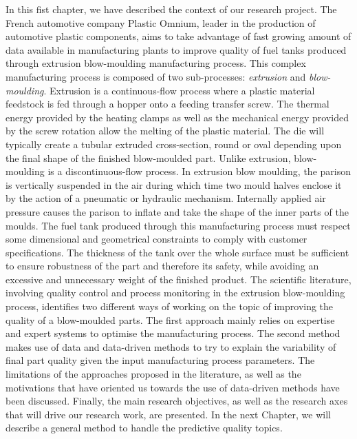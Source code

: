 In this fist chapter, we have described the context of our research project. The French automotive company Plastic Omnium, leader in the production of automotive plastic components, aims to take advantage of fast growing amount of data available in manufacturing plants to improve quality of fuel tanks produced through extrusion blow-moulding manufacturing process. This complex manufacturing process is composed of two sub-processes: \textit{extrusion} and \textit{blow-moulding}. Extrusion is a continuous-flow process where a plastic material feedstock is fed through a hopper onto a feeding transfer screw. The thermal energy provided by the heating clamps as well as the mechanical energy provided by the screw rotation allow the melting of the plastic material. The die will typically create a tubular extruded cross-section, round or oval depending upon the final shape of the finished blow-moulded part. Unlike extrusion, blow-moulding is a discontinuous-flow process. In extrusion blow moulding, the parison is vertically suspended in the air during which time two mould halves enclose it by the action of a pneumatic or hydraulic mechanism. Internally applied air pressure causes the parison to inflate and take the shape of the inner parts of the moulds. The fuel tank produced through this manufacturing process must respect some dimensional and geometrical constraints to comply with customer specifications. The thickness of the tank over the whole surface must be sufficient to ensure robustness of the part and therefore its safety, while avoiding an excessive and unnecessary weight of the finished product. The scientific literature, involving quality control and process monitoring in the extrusion blow-moulding process, identifies two different ways of working on the topic of improving the quality of a blow-moulded parts. The first approach mainly relies on expertise and expert systems to optimise the manufacturing process. The second method makes use of data and data-driven methods to try to explain the variability of final part quality given the input manufacturing process parameters. The limitations of the approaches proposed in the literature, as well as the motivations that have oriented us towards the use of data-driven methods have been discussed. Finally, the main research objectives, as well as the research axes that will drive our research work, are presented. In the next Chapter, we will describe a general method to handle the predictive quality topics.   

\cleardoublepage